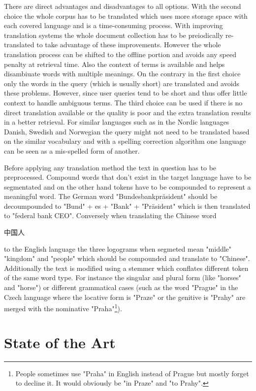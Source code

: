 \documentclass[journal]{IEEEtran}
\begin{document}
There are direct advantages and disadvantages to all options. With the second choice the whole corpus has to be translated which uses more storage space with each covered language and is a time-consuming process. With improving translation systems the whole document collection has to be preiodically re-translated to take advantage of these improvements. However the whole translation process can be shifted to the offline portion and avoids any speed penalty at retrieval time. Also the context of terms is available and helps disambiuate words with multiple meanings. On the contrary in the first choice only the words in the query (which is usually short) are translated and avoids these problems. However, since user queries tend to be short and thus offer little context to handle ambiguous terms. The third choice can be used if there is no direct translation available or the quality is poor and the extra translation results in a better retrieval. For similar languages such as in the Nordic languages Danish, Swedish and Norwegian the query might not need to be translated based on the similar vocabulary and with a spelling correction algorithm one language can be seen as a mis-spelled form of another.

Before applying any translation method the text in question has to be preprocessed. Compound words that don't exist in the target language have to be segmentated and on the other hand tokens have to be compounded to represent a meaningful word. The German word "Bundesbankpräsident" should be decoumpounded to "Bund" + es + "Bank" + "Präsident" which is then translated to "federal bank CEO". Conversely when translating the Chinese word \begin{CJK}{UTF8}{gbsn}中国人\end{CJK} to the English language the three logograms when segmeted mean "middle" "kingdom" and "people" which should be compounded and translate to "Chinese".
Additionally the text is modified using a stemmer which conflates different token of the same word type. For instance the singular and plural form (like "horses" and "horse") or different grammatical cases (such as the word "Prague" in the Czech language where the locative form is "Praze" or the genitive is "Prahy" are merged with the nominative "Praha"\footnote{People sometimes use "Praha" in English instead of Prague but mostly forget to decline it. It would obviously be "in Praze" and "to Prahy".}).


\section{State of the Art}
\end{document}
